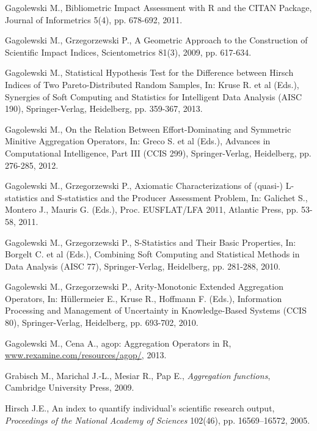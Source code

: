 \documentclass[11pt]{article}\usepackage{graphicx, color}
\newcommand{\package}[1]{\textsf{#1}\xspace}
\newcommand{\lang}[1]{\textsf{#1}\xspace}
\newcommand{\R}{\lang{R}}
\theoremstyle{remark}
\theoremstyle{definition}
\begin{document}
\begin{thebibliography}{100}
Gagolewski M.,
Bibliometric Impact Assessment with \R and the \package{CITAN} Package, 
Journal of Informetrics 5(4), pp. 678-692, 2011.

Gagolewski M., Grzegorzewski P.,
A Geometric Approach to the Construction of Scientific Impact Indices,
Scientometrics 81(3), 2009, pp. 617-634.

Gagolewski M.,
Statistical Hypothesis Test for the Difference between Hirsch Indices of Two Pareto-Distributed Random Samples, 
In: Kruse R. et al (Eds.), Synergies of Soft Computing and Statistics for Intelligent Data Analysis (AISC 190),
Springer-Verlag, Heidelberg, pp. 359-367, 2013.

Gagolewski M.,
On the Relation Between Effort-Dominating and Symmetric Minitive Aggregation Operators,
In: Greco S. et al (Eds.), Advances in Computational Intelligence, 
Part III (CCIS 299), Springer-Verlag, Heidelberg, pp. 276-285, 2012.

Gagolewski M., Grzegorzewski P.,
Axiomatic Characterizations of (quasi-) L-statistics and S-statistics and the Producer Assessment Problem, 
In: Galichet S., Montero J., Mauris G. (Eds.), Proc. EUSFLAT/LFA 2011, Atlantic Press, pp. 53-58, 2011.

Gagolewski M., Grzegorzewski P., S-Statistics and Their Basic Properties, In: Borgelt C. et al (Eds.), 
Combining Soft Computing and Statistical Methods in Data Analysis (AISC 77), 
Springer-Verlag, Heidelberg, pp. 281-288, 2010.

Gagolewski M., Grzegorzewski P., Arity-Monotonic Extended Aggregation Operators, 
In: H\"{u}llermeier E., Kruse R., Hoffmann F. (Eds.),
Information Processing and Management of Uncertainty in Knowledge-Based Systems (CCIS 80), 
Springer-Verlag, Heidelberg, pp. 693-702, 2010.

Gagolewski M., Cena A., \package{agop}: Aggregation Operators in \R,
\href{http://www.rexamine.com/resources/agop/}{www.rexamine.com/resources/agop/},
2013.

Grabisch M., Marichal J.-L.,  Mesiar R., Pap E.,
\textit{Aggregation functions},
Cambridge University Press, 2009.

Hirsch J.E.,
An index to quantify individual's scientific research output,
\textit{Proceedings of the National Academy of Sciences} 102(46), pp. 16569--16572,
2005.


\end{thebibliography}
\end{document}
